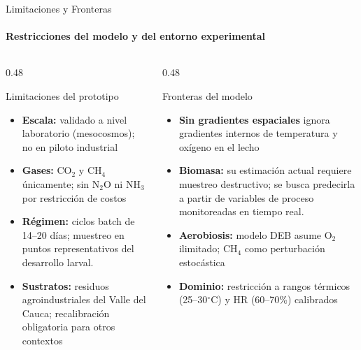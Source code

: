 \documentclass[aspectratio=169, 11pt]{beamer}
\begin{document}
\begin{frame}{Limitaciones y Fronteras}
\framesubtitle{Restricciones del modelo y del entorno experimental}

\begin{columns}[T,onlytextwidth]

\begin{column}{0.48\textwidth}

\begin{alertblock}{Limitaciones del prototipo}
\scriptsize
\begin{itemize}
    \item \textbf{Escala:} validado a nivel laboratorio (mesocosmos); no en piloto industrial
    \item \textbf{Gases:} CO$_2$ y CH$_4$ únicamente; sin N$_2$O ni NH$_3$ por restricción de costos
    \item \textbf{Régimen:} ciclos batch de 14--20 días; muestreo en puntos representativos del desarrollo larval.
    \item \textbf{Sustratos:} residuos agroindustriales del Valle del Cauca; recalibración obligatoria para otros contextos
\end{itemize}
\end{alertblock}

\end{column}

\begin{column}{0.48\textwidth}

\begin{alertblock}{Fronteras del modelo}
\scriptsize
\begin{itemize}
    \item \textbf{Sin gradientes espaciales} ignora gradientes internos de temperatura y oxígeno en el lecho
    \item \textbf{Biomasa:} su estimación actual requiere muestreo destructivo; se busca predecirla a partir de variables de proceso monitoreadas en tiempo real.
    \item \textbf{Aerobiosis:} modelo DEB asume O$_2$ ilimitado; CH$_4$ como perturbación estocástica
    \item \textbf{Dominio:} restricción a rangos térmicos (25--30$^{\circ}$C) y HR (60--70\%) calibrados
\end{itemize}
\end{alertblock}

\end{column}

\end{columns}
\end{frame}
\end{document}
